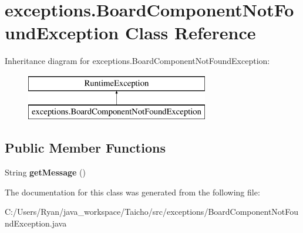 \hypertarget{classexceptions_1_1_board_component_not_found_exception}{\section{exceptions.\-Board\-Component\-Not\-Found\-Exception Class Reference}
\label{classexceptions_1_1_board_component_not_found_exception}
}
Inheritance diagram for exceptions.\-Board\-Component\-Not\-Found\-Exception\-:\begin{figure}[H]
\begin{center}
\leavevmode
\includegraphics[height=2.000000cm]{classexceptions_1_1_board_component_not_found_exception}
\end{center}
\end{figure}
\subsection*{Public Member Functions}
\begin{DoxyCompactItemize}
\item 
\hypertarget{classexceptions_1_1_board_component_not_found_exception_a241aeca5a563f639c7909cdc54adf812}{String {\bfseries get\-Message} ()}\label{classexceptions_1_1_board_component_not_found_exception_a241aeca5a563f639c7909cdc54adf812}

\end{DoxyCompactItemize}


The documentation for this class was generated from the following file\-:\begin{DoxyCompactItemize}
\item 
C\-:/\-Users/\-Ryan/java\-\_\-workspace/\-Taicho/src/exceptions/Board\-Component\-Not\-Found\-Exception.\-java\end{DoxyCompactItemize}
